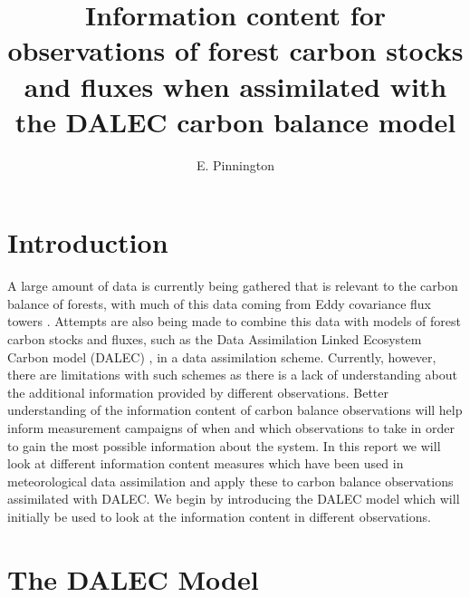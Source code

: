 \documentclass[11pt]{article}
\title{Information content for observations of forest carbon stocks and fluxes when assimilated with the DALEC carbon balance model}
\author{\normalsize{E. Pinnington}}
\begin{document}
\maketitle

\section{Introduction}

A large amount of data is currently being gathered that is relevant to the carbon balance of forests, with much of this data coming from Eddy covariance flux towers \cite{baldocchi2008turner}. Attempts are also being made to combine this data with models of forest carbon stocks and fluxes, such as the Data Assimilation Linked Ecosystem Carbon model (DALEC) \cite{williams2005improved}, in a data assimilation scheme. Currently, however, there are limitations with such schemes as there is a lack of understanding about the additional information provided by different observations. Better understanding of the information content of carbon balance observations will help inform measurement campaigns of when and which observations to take in order to gain the most possible information about the system. In this report we will look at different information content measures which have been used in meteorological data assimilation \cite{rodgers2000inverse, fisher2003estimation, sandu2012practical} and apply these to carbon balance observations assimilated with DALEC. We begin by introducing the DALEC model which will initially be used to look at the information content in different observations.

\section{The DALEC Model}
\end{document}
